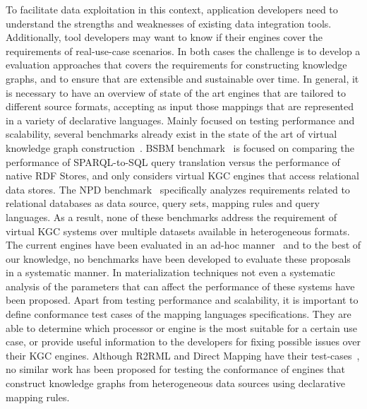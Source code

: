 To facilitate data exploitation in this context, application developers need to understand the strengths and weaknesses of existing data integration tools. Additionally, tool developers may want to know if their engines cover the requirements of real-use-case scenarios. In both cases the challenge is to develop a evaluation approaches that covers the requirements for constructing knowledge graphs, and to ensure that are extensible and sustainable over time. In general, it is necessary to have an overview of state of the art engines that are tailored to different source formats, accepting as input those mappings that are represented in a variety of declarative languages. Mainly focused on testing performance and scalability, several benchmarks already exist in the state of the art of virtual knowledge graph construction~\citep{bizer2009berlin,lanti2015npd}. BSBM benchmark~\citep{bizer2009berlin} is focused on comparing the performance of SPARQL-to-SQL query translation versus the performance of native RDF Stores, and only considers virtual KGC engines that access relational data stores. The NPD benchmark~\citep{lanti2015npd} specifically analyzes requirements related to relational databases as data source, query sets, mapping rules and query languages. As a result, none of these benchmarks address the requirement of virtual KGC systems over multiple datasets available in heterogeneous formats. The current engines have been evaluated in an ad-hoc manner~\citep{endris2019ontario,mami2019querying} and to the best of our knowledge, no benchmarks have been developed to evaluate these proposals in a systematic manner. In materialization techniques not even a systematic analysis of the parameters that can affect the performance of these systems have been proposed. Apart from testing performance and scalability, it is important to define conformance test cases of the mapping languages specifications. They are able to determine which processor or engine is the most suitable for a certain use case, or provide useful information to the developers for fixing possible issues over their KGC engines. Although R2RML and Direct Mapping have their test-cases~\citep{R2RML_test_cases}, no similar work has been proposed for testing the conformance of engines that construct knowledge graphs from heterogeneous data sources using declarative mapping rules.

